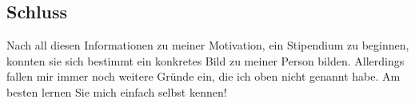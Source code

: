 \documentclass{scrartcl}
\begin{document}
\subsection{Schluss}
Nach all diesen Informationen zu meiner Motivation, ein Stipendium zu beginnen, konnten sie
sich bestimmt ein konkretes Bild zu meiner Person bilden. Allerdings fallen mir immer noch
weitere Gründe ein, die ich oben nicht genannt habe. Am besten lernen Sie mich einfach selbst kennen!
\end{document}
